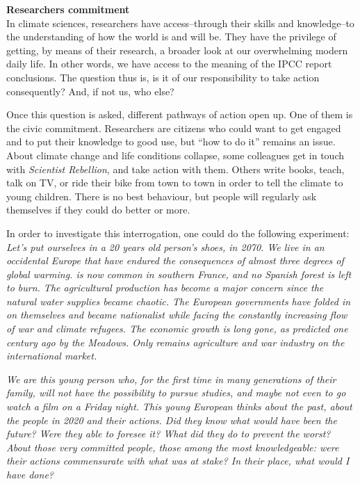 
\vspace{\baselineskip}
\textbf{Researchers commitment}\\
In climate sciences, researchers have access\---through their skills and knowledge\---to the understanding of how the world is and will be. They have the privilege of getting, by means of their research, a broader look at our overwhelming modern daily life. In other words, we have access to the meaning of the IPCC report conclusions. 
The question thus is, is it of our responsibility to take action consequently? And, if not us, who else?

Once this question is asked, different pathways of action open up. One of them is the civic commitment. Researchers are citizens who could want to get engaged and to put their knowledge to good use, but ``how to do it'' remains an issue.
About climate change and life conditions collapse, some colleagues get in touch with \textit{Scientist Rebellion}, and take action with them. Others write books, teach, talk on TV, or ride their bike from town to town in order to tell the climate to young children.
There is no best behaviour, but people will regularly ask themselves if they could do better or more.

In order to investigate this interrogation, one could do the following experiment:
\emph{Let's put ourselves in a 20 years old person's shoes, in 2070. We live in an occidental Europe that have endured the consequences of almost three degrees of global warming. 
 is now common in southern France, and no Spanish forest is left to burn. The agricultural production has become a major concern since the natural water supplies became chaotic.
The European governments have folded in on themselves and became nationalist while facing the constantly increasing flow of war and climate refugees.
The economic growth is long gone, as predicted one century ago by the Meadows. Only remains agriculture and war industry on the international market.} 

\emph{We are this young person who, for the first time in many generations of their family, will not have the possibility to pursue studies, and maybe not even to go watch a film on a Friday night. %
This young European thinks about the past, about the people in 2020 and their actions. Did they know what would have been the future? Were they able to foresee it? What did they do to prevent the worst? 
About those very committed people, those among the most knowledgeable: were their actions commensurate with what was at stake? In their place, what would I have done?}


